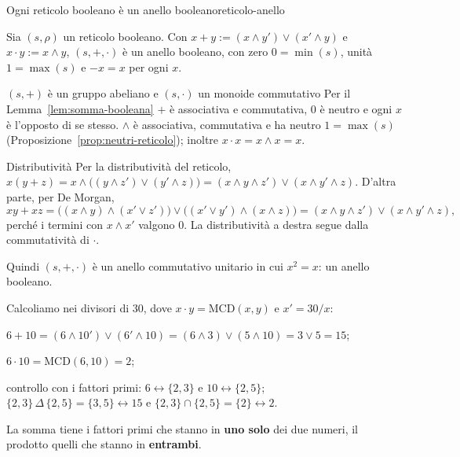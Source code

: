 \begin{concetto}
\begin{Teorema}{Ogni reticolo booleano è un anello booleano}{reticolo-anello}
    \begin{prerequisiti}
    \end{prerequisiti}
    Sia $(s, \rho)$ un reticolo booleano. Con $x + y := (x \wedge y') \vee (x' \wedge y)$ e $x \cdot y := x \wedge y$, $(s, +, \cdot)$ è un anello booleano, con zero
    $0 = \min(s)$, unità $1 = \max(s)$ e $-x = x$ per ogni $x$.
\end{Teorema}
\begin{dimostrazione}
    \begin{caso}{$(s, +)$ è un gruppo abeliano e $(s, \cdot)$ un monoide commutativo}
        Per il Lemma~\ref{lem:somma-booleana} $+$ è associativa e commutativa, $0$ è neutro e ogni $x$ è l'opposto di se stesso. $\wedge$ è associativa, commutativa
        e ha neutro $1 = \max(s)$ (Proposizione~\ref{prop:neutri-reticolo}); inoltre $x \cdot x = x \wedge x = x$.
    \end{caso}
    \begin{caso}{Distributività}
        Per la distributività del reticolo, $x(y + z) = x \wedge \big((y \wedge z') \vee (y' \wedge z)\big) = (x \wedge y \wedge z') \vee (x \wedge y' \wedge z)$. D'altra parte, per De Morgan,
        \[ xy + xz = \big((x \wedge y) \wedge (x' \vee z')\big) \vee \big((x' \vee y') \wedge (x \wedge z)\big) = (x \wedge y \wedge z') \vee (x \wedge y' \wedge z), \]
        perché i termini con $x \wedge x'$ valgono $0$. La distributività a destra segue dalla commutatività di $\cdot$.
    \end{caso}
    Quindi $(s, +, \cdot)$ è un anello commutativo unitario in cui $x^2 = x$: un anello booleano.
\end{dimostrazione}
\end{concetto}

\begin{spiegazione}
    Calcoliamo nei divisori di $30$, dove $x \cdot y = \mathrm{MCD}(x, y)$ e $x' = 30/x$:
    \begin{passi}
        \item $6 + 10 = (6 \wedge 10') \vee (6' \wedge 10) = (6 \wedge 3) \vee (5 \wedge 10) = 3 \vee 5 = 15$;
        \item $6 \cdot 10 = \mathrm{MCD}(6, 10) = 2$;
        \item controllo con i fattori primi: $6 \leftrightarrow \{2, 3\}$ e $10 \leftrightarrow \{2, 5\}$; $\{2, 3\} \,\Delta\, \{2, 5\} = \{3, 5\} \leftrightarrow 15$ e $\{2, 3\} \cap \{2, 5\} = \{2\} \leftrightarrow 2$.
    \end{passi}
    La somma tiene i fattori primi che stanno in \textbf{uno solo} dei due numeri, il prodotto quelli che stanno in \textbf{entrambi}.
\end{spiegazione}

